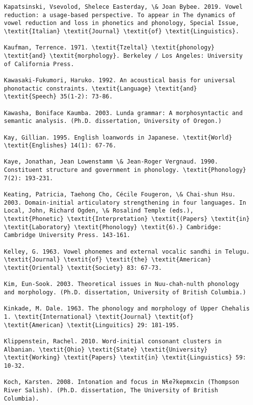 \begin{verbatim}
Kapatsinski, Vsevolod, Shelece Easterday, \& Joan Bybee. 2019. Vowel reduction: a usage-based perspective. To appear in The dynamics of vowel reduction and loss in phonetics and phonology, Special Issue, \textit{Italian} \textit{Journal} \textit{of} \textit{Linguistics}.

Kaufman, Terrence. 1971. \textit{Tzeltal} \textit{phonology} \textit{and} \textit{morphology}. Berkeley / Los Angeles: University of California Press.

Kawasaki-Fukumori, Haruko. 1992. An acoustical basis for universal phonotactic constraints. \textit{Language} \textit{and} \textit{Speech} 35(1-2): 73-86.

Kawasha, Boniface Kaumba. 2003. Lunda grammar: A morphosyntactic and semantic analysis. (Ph.D. dissertation, University of Oregon.)

Kay, Gillian. 1995. English loanwords in Japanese. \textit{World} \textit{Englishes} 14(1): 67-76.

Kaye, Jonathan, Jean Lowenstamm \& Jean-Roger Vergnaud. 1990. Constituent structure and government in phonology. \textit{Phonology} 7(2): 193-231.

Keating, Patricia, Taehong Cho, Cécile Fougeron, \& Chai-shun Hsu. 2003. Domain-initial articulatory strengthening in four languages. In Local, John, Richard Ogden, \& Rosalind Temple (eds.), \textit{Phonetic} \textit{Interpretation} \textit{(Papers} \textit{in} \textit{Laboratory} \textit{Phonology} \textit{6).} Cambridge: Cambridge University Press. 143-161.

Kelley, G. 1963. Vowel phonemes and external vocalic sandhi in Telugu. \textit{Journal} \textit{of} \textit{the} \textit{American} \textit{Oriental} \textit{Society} 83: 67-73.

Kim, Eun-Sook. 2003. Theoretical issues in Nuu-chah-nulth phonology and morphology. (Ph.D. dissertation, University of British Columbia.)

Kinkade, M. Dale. 1963. The phonology and morphology of Upper Chehalis 1. \textit{International} \textit{Journal} \textit{of} \textit{American} \textit{Linguitics} 29: 181-195.

Klippenstein, Rachel. 2010. Word-initial consonant clusters in Albanian. \textit{Ohio} \textit{State} \textit{University} \textit{Working} \textit{Papers} \textit{in} \textit{Linguistics} 59: 10-32.

Koch, Karsten. 2008. Intonation and focus in Nɬeʔkepmxcin (Thompson River Salish). (Ph.D. dissertation, The University of British Columbia).


\end{verbatim}
